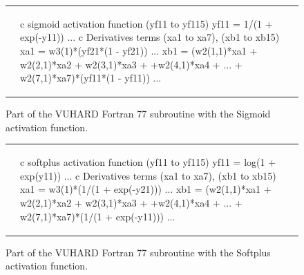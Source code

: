 \documentclass[algorithms,article,accept,pdftex,oneauthor]{Definitions/mdpi}
\begin{document}
\begin{figure}[H]
\begin{tabular}{ll}
 & {\begin{FortranListing}
c sigmoid activation function (yf11 to yf115)
      yf11 = 1/(1 + exp(-y11))
      ...
c Derivatives terms (xa1 to xa7), (xb1 to xb15)
      xa1 = w3(1)*(yf21*(1 - yf21))
      ...
      xb1 = (w2(1,1)*xa1 + w2(2,1)*xa2 + w2(3,1)*xa3
     + +w2(4,1)*xa4 + ... + w2(7,1)*xa7)*(yf11*(1 - yf11))
      ...
\end{FortranListing}}
\end{tabular}
\caption{Part of the VUHARD Fortran 77 subroutine with the Sigmoid activation function.\label{fig:FortranSigmoid}}
\end{figure}
\begin{figure}[H]
\begin{tabular}{ll}
 & {\begin{FortranListing}
c softplus activation function (yf11 to yf115)
      yf11 = log(1 + exp(y11))
      ...
c Derivatives terms (xa1 to xa7), (xb1 to xb15)
      xa1 = w3(1)*(1/(1 + exp(-y21)))
      ...
      xb1 = (w2(1,1)*xa1 + w2(2,1)*xa2 + w2(3,1)*xa3
     + +w2(4,1)*xa4 + ... + w2(7,1)*xa7)*(1/(1 + exp(-y11)))
      ...
\end{FortranListing}}
\end{tabular}
\caption{Part of the VUHARD Fortran 77 subroutine with the Softplus activation function.\label{fig:FortranSoftplus}}
\end{figure}
\end{document}
